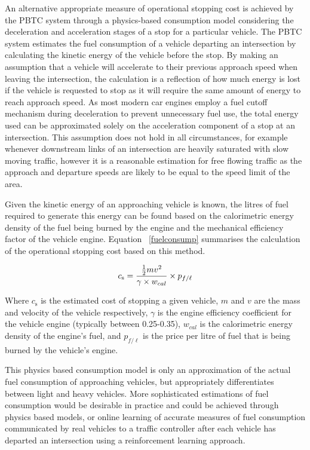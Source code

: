 An alternative appropriate measure of operational stopping cost is achieved by the PBTC system through a physics-based consumption model considering the deceleration and acceleration stages of a stop for a particular vehicle. The PBTC system estimates the fuel consumption of a vehicle departing an intersection by calculating the kinetic energy of the vehicle before the stop. By making an assumption that a vehicle will accelerate to their previous approach speed when leaving the intersection, the calculation is a reflection of how much energy is lost if the vehicle is requested to stop as it will require the same amount of energy to reach approach speed. As most modern car engines employ a fuel cutoff mechanism during deceleration to prevent unnecessary fuel use, the total energy used can be approximated solely on the acceleration component of a stop at an intersection. This assumption does not hold in all circumstances, for example whenever downstream links of an intersection are heavily saturated with slow moving traffic, however it is a reasonable estimation for free flowing traffic as the approach and departure speeds are likely to be equal to the speed limit of the area. 

Given the kinetic energy of an approaching vehicle is known, the litres of fuel required to generate this energy can be found based on the calorimetric energy density of the fuel being burned by the engine and the mechanical efficiency factor of the vehicle engine. Equation ~\ref{fuelconsump} summarises the calculation of the operational stopping cost based on this method.

\begin{align}
	\centering
		c_\text{s} = {\frac{\frac{1}{2}m{v}^{2} }{\gamma \times w_{cal}}} \times {p_{f\text{/}\ell}}
	\label{fuelconsump}
\end{align}

Where $c_\text{s}$ is the estimated cost of stopping a given vehicle, $m$ and $v$ are the mass and velocity of the vehicle respectively, $\gamma$ is the engine efficiency coefficient for the vehicle engine (typically between 0.25-0.35), $w_{cal}$ is the calorimetric energy density of the engine's fuel, and $p_{f\text{/}\ell}$ is the price per litre of fuel that is being burned by the vehicle's engine.

This physics based consumption model is only an approximation of the actual fuel consumption of approaching vehicles, but appropriately differentiates between light and heavy vehicles. More sophisticated estimations of fuel consumption would be desirable in practice and could be achieved through physics based models, or online learning of accurate measures of fuel consumption communicated by real vehicles to a traffic controller after each vehicle has departed an intersection using a reinforcement learning approach.

